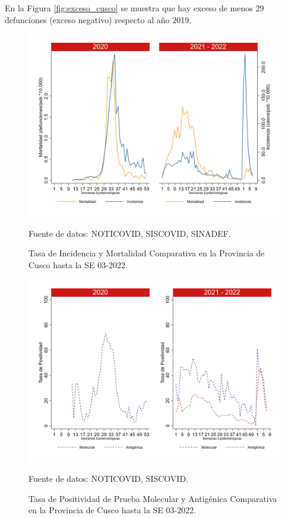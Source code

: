 \documentclass[12pt,a4paper,openany]{book}
\begin{document}
	En la Figura \ref{fig:exceso_cusco} se muestra que hay exceso de menos 29 defunciones (exceso negativo) respecto al año 2019.
		
		\begin{figure}[h]
			\caption{Tasa de Incidencia y Mortalidad Comparativa en la Provincia de Cusco hasta la SE 03-2022.}\label{fig:inc_mort_cusco}
			\begin{center}
				\includegraphics[width=0.7\linewidth]{../figuras/incidencia_mortalidad_20_21_7.png}
			\end{center}
			{\footnotesize {Fuente de datos: NOTICOVID, SISCOVID, SINADEF.}}
		\end{figure}
		
		\begin{figure}[h]
			\caption{Tasa de Positividad de Prueba Molecular y Antigénica Comparativa en la Provincia de Cusco hasta la SE 03-2022.}\label{fig:positividad_cusco}
			\begin{center}
				\includegraphics[width=0.7\linewidth]{../figuras/positividad_20_21_7.png}
			\end{center}
			{\footnotesize {Fuente de datos: NOTICOVID, SISCOVID.}}
		\end{figure}
		
\end{document}
